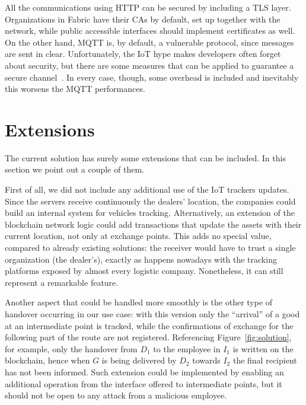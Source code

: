 All the communications using HTTP can be secured by including a TLS layer. Organizations in Fabric have their CAs by default, set up together with the network, while public accessible interfaces should implement certificates as well. On the other hand, MQTT is, by default, a vulnerable protocol, since messages are sent in clear. Unfortunately, the IoT hype makes developers often forget about security, but there are some measures that can be applied to guarantee a secure channel~\cite{securemqtt}. In every case, though, some overhead is included and inevitably this worsens the MQTT performances.

\section{Extensions}
The current solution has surely some extensions that can be included. In this section we point out a couple of them.

First of all, we did not include any additional use of the IoT trackers updates. Since the servers receive continuously the dealers' location, the companies could build an internal system for vehicles tracking. Alternatively, an extension of the blockchain network logic could add transactions that update the assets with their current location, not only at exchange points. This adds no special value, compared to already existing solutions: the receiver would have to trust a single organization (the dealer's), exactly as happens nowadays with the tracking platforms exposed by almost every logistic company. Nonetheless, it can still represent a remarkable feature.

Another aspect that could be handled more smoothly is the other type of handover occurring in our use case: with this version only the ``arrival'' of a good at an intermediate point is tracked, while the confirmations of exchange for the following part of the route are not registered. Referencing Figure~\ref{fig:solution}, for example, only the handover from $D_1$ to the employee in $I_1$ is written on the blockchain, hence when $G$ is being delivered by $D_2$ towards $I_2$ the final recipient has not been informed. Such extension could be implemented by enabling an additional operation from the interface offered to intermediate points, but it should not be open to any attack from a malicious employee.

